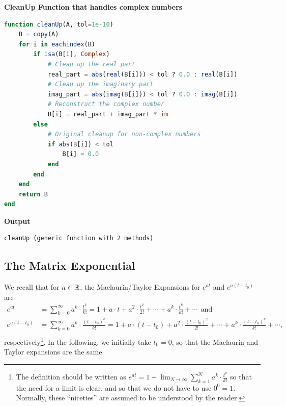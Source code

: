 \textbf{CleanUp Function that handles complex numbers}

\begin{lstlisting}[language=Julia,style=mystyle]
function cleanUp(A, tol=1e-10)
    B = copy(A)
    for i in eachindex(B)
        if isa(B[i], Complex)
            # Clean up the real part
            real_part = abs(real(B[i])) < tol ? 0.0 : real(B[i])
            # Clean up the imaginary part
            imag_part = abs(imag(B[i])) < tol ? 0.0 : imag(B[i])
            # Reconstruct the complex number
            B[i] = real_part + imag_part * im
        else
            # Original cleanup for non-complex numbers
            if abs(B[i]) < tol
                B[i] = 0.0
            end
        end
    end
    return B
end
\end{lstlisting}
\textbf{Output} 
\begin{verbatim}
cleanUp (generic function with 2 methods)
\end{verbatim}



\subsection{The Matrix Exponential}
\label{sec:MatrixExponential}

We recall that for $a \in \mathbb R$, the Maclaurin/Taylor Expansions for $e^{at}$ and $e^{a(t-t_0)}$ are
\begin{equation}
    \begin{aligned}
        e^{at}&= \sum_{k=0}^\infty a^k \cdot \frac{t^k}{k!} = 1 + a \cdot t + a^2 \cdot \frac{t^2}{2!} + \cdots + a^k \cdot \frac{t^k}{k!} + \cdots ~~\text{and}\\[1em]
        e^{a(t-t_0)}&= \sum_{k=0}^\infty a^k \cdot \frac{(t-t_0)^k}{k!} = 1 +a \cdot (t-t_0) + a^2 \cdot \frac{(t-t_0)^2}{2!} + \cdots + a^k \cdot \frac{(t-t_0)^k}{k!} + \cdots, \\[1em]
    \end{aligned}
\end{equation}
respectively\footnote{The definition should be written as $e^{at}=1 + \lim_{N \to \infty} \sum_{k=1}^N a^k \cdot \frac{t^k}{k!}$ so that the need for a limit is clear, and so that we do not have to use $0^0=1$. Normally, these ``niceties'' are assumed to be understood by the reader.}. In the following, we initially take $t_0=0$, so that the Maclaurin and Taylor expansions are the same.

\bigskip

